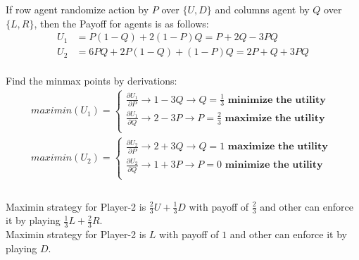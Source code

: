 \documentclass[
  course = {{IE579 Game Theory and Multi-Agent Reinforcement Learning}},
  quartile = {{4}},
  assignment = 2,
  name = {{Mohammad Mahdi Rahimi}},
  studentnumber = {{20208244}},
  email = {{mahi@kaist.ac.kr}},
  firstexercise = 1
]{aga-homework}
\begin{document}
\exercise
\subexercise
\\\\
If row agent randomize action by $P$ over $\{U, D\}$ and columns agent by $Q$ over $\{L, R\}$, then the Payoff for agents is as follows:
\begin{equation} \label{eq1}
\begin{split}
U_1 & = P(1 - Q) + 2(1 - P)Q = P + 2Q - 3PQ \\
U_2 & = 6PQ + 2P(1 - Q) + (1 - P)Q = 2P + Q + 3PQ
\end{split}
\end{equation}\\
Find the minmax points by derivations:
\begin{equation} \label{eq1}
\begin{split}
maximin(U_1) = \begin{cases}
      \frac{\partial U_1}{\partial P} \rightarrow 1 - 3Q \rightarrow Q = \frac{1}{3}\textbf{ minimize the utility }\\
      \frac{\partial U_1}{\partial Q} \rightarrow 2 - 3P \rightarrow P = \frac{2}{3}\textbf{ maximize the utility }\\
     \end{cases}\\
maximin(U_2) = \begin{cases}
      \frac{\partial U_2}{\partial P} \rightarrow 2 + 3Q \rightarrow Q = 1\textbf{ maximize the utility }\\
      \frac{\partial U_2}{\partial Q} \rightarrow 1 + 3P \rightarrow P = 0\textbf{ minimize the utility }\\
     \end{cases}\\
\end{split}
\end{equation}\\
Maximin strategy for Player-2 is $\frac{2}{3}U + \frac{1}{3}D$ with payoff of $\frac{2}{3}$ and other can enforce it by playing $\frac{1}{3}L + \frac{2}{3}R$.
\\
Maximin strategy for Player-2 is $L$ with payoff of $1$ and other can enforce it by playing $D$.
\end{document}

